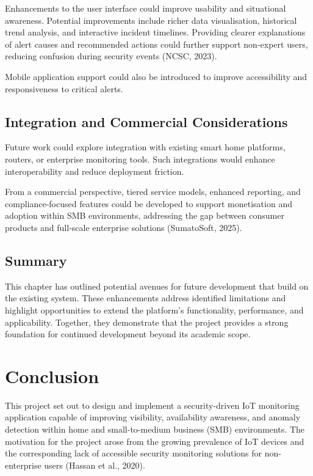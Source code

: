 Enhancements to the user interface could improve usability and situational awareness. Potential improvements include richer data visualisation, historical trend analysis, and interactive incident timelines. Providing clearer explanations of alert causes and recommended actions could further support non-expert users, reducing confusion during security events (NCSC, 2023).

Mobile application support could also be introduced to improve accessibility and responsiveness to critical alerts.

\section{Integration and Commercial Considerations}

Future work could explore integration with existing smart home platforms, routers, or enterprise monitoring tools. Such integrations would enhance interoperability and reduce deployment friction.

From a commercial perspective, tiered service models, enhanced reporting, and compliance-focused features could be developed to support monetisation and adoption within SMB environments, addressing the gap between consumer products and full-scale enterprise solutions (SumatoSoft, 2025).

\section{Summary}

This chapter has outlined potential avenues for future development that build on the existing system. These enhancements address identified limitations and highlight opportunities to extend the platform's functionality, performance, and applicability. Together, they demonstrate that the project provides a strong foundation for continued development beyond its academic scope.

\chapter{Conclusion}

This project set out to design and implement a security-driven IoT monitoring application capable of improving visibility, availability awareness, and anomaly detection within home and small-to-medium business (SMB) environments. The motivation for the project arose from the growing prevalence of IoT devices and the corresponding lack of accessible security monitoring solutions for non-enterprise users (Hassan et al., 2020).

